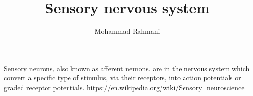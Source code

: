 \documentclass[a4paper]{article}
\title{Sensory nervous system}
\date{}
\author{Mohammad Rahmani}
\begin{document}
    \maketitle
    Sensory neurons, also known as afferent neurons, are in the nervous system which convert a specific type of stimulus, via their receptors, into action potentials or graded receptor potentials.
    \url{https://en.wikipedia.org/wiki/Sensory_neuroscience}
    
    
\end{document}
